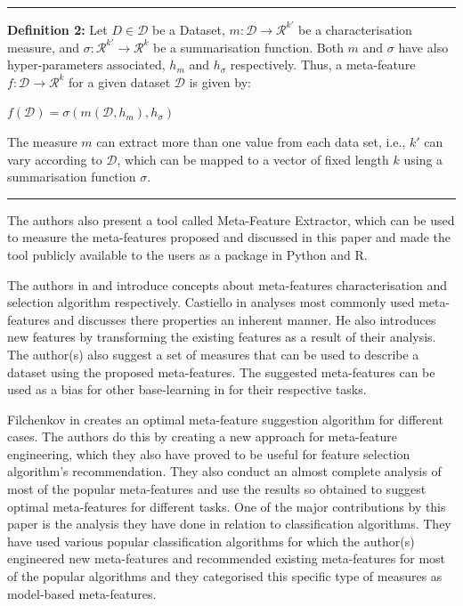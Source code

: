 \par\noindent\rule{\textwidth}{0.4pt}\newline
\textbf{Definition 2:} Let ${\displaystyle{D \in \mathcal{D} }}$ be a Dataset, ${\displaystyle{m: \mathcal{D} \to \mathcal{R}^{k'}}}$ be a characterisation measure, and $\displaystyle{\sigma: \mathcal{R}^{k'} \to \mathcal{R}^{k}}$ be a summarisation function. Both $\displaystyle{m}$ and $\sigma$ have also hyper-parameters associated, $h_m$ and $h_\sigma$ respectively. Thus, a meta-feature $\displaystyle{f: \mathcal{D} \to \mathcal{R}^{k}}$ for a given dataset $\displaystyle{\mathcal{D}}$ is given by:

\begin{center}
    $\displaystyle{f(\mathcal{D}) = \sigma(m(\mathcal{D}, h_m), h_\sigma)}$
\end{center}

The measure $\displaystyle{m}$ can extract more than one value from each data set, i.e., $\displaystyle{k'}$ can vary according to $\displaystyle{\mathcal{D}}$, which can be mapped to a vector of fixed length $\displaystyle{k}$ using a summarisation function $\displaystyle{\sigma}$.

\par\noindent\rule{\textwidth}{0.4pt}

The authors also present a tool called Meta-Feature Extractor, which can be used to measure the meta-features proposed and discussed in this paper and made the tool publicly available to the users as a package in Python and R.

The authors in \citep{meta-features-1} and \citep{meta-features-2} introduce concepts about meta-features characterisation and selection algorithm respectively. Castiello in \citep{meta-features-1} analyses most commonly used meta-features and discusses there properties an inherent manner. He also introduces new features by transforming the existing features as a result of their analysis. The author(s) also suggest a set of measures that can be used to describe a dataset using the proposed meta-features. The suggested meta-features can be used as a bias for other base-learning in for their respective tasks. 

Filchenkov in \citep{meta-features-2} creates an optimal meta-feature suggestion algorithm for different cases. The authors do this by creating a new approach for meta-feature engineering, which they also have proved to be useful for feature selection algorithm's recommendation. They also conduct an almost complete analysis of most of the popular meta-features and use the results so obtained to suggest optimal meta-features for different tasks. One of the major contributions by this paper is the analysis they have done in relation to classification algorithms. They have used various popular classification algorithms for which the author(s) engineered new meta-features and recommended existing meta-features for most of the popular algorithms and they categorised this specific type of measures as model-based meta-features.

